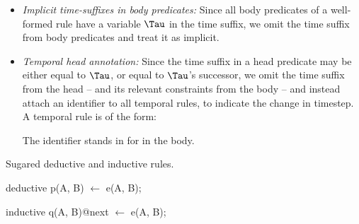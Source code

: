 \begin{itemize}
%
%
\item {\em Implicit time-suffixes in body predicates:} Since all body
predicates of a well-formed rule have a variable $\Tau$ in the time suffix, we
omit the time suffix from body predicates and treat it as implicit.
%
\item {\em Temporal head annotation:} Since the time suffix in a head predicate
may be either equal to $\Tau$, or equal to $\Tau$'s successor, we omit the time
suffix from the head -- and its relevant constraints from the body -- and
instead attach an identifier to all temporal rules, to indicate the change in
timestep.  A temporal rule is of the form:


The identifier  stands in for  in
the body.

%
%
%
%
%
\end{itemize}


\begin{example}
Sugared deductive and inductive rules.

\begin{Dedalus}
deductive
p(A, B) \(\leftarrow\) e(A, B);
  
inductive 
q(A, B)@next \(\leftarrow\) e(A, B);
\end{Dedalus}
\end{example}


